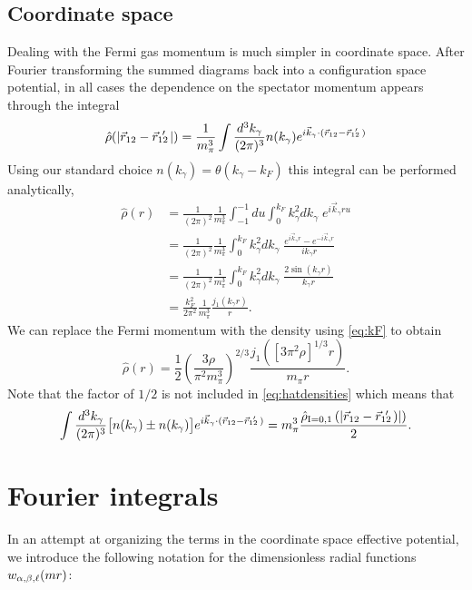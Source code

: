 \section{\label{app:rhohat}Coordinate space}

Dealing with the Fermi gas momentum is much simpler in coordinate space. After Fourier transforming the summed diagrams back into a configuration space potential, in all cases the dependence on the spectator momentum appears through the integral
\begin{equation}
\hat{\rho}(|\vec{r}_{12}-\vec{r}_{12}\!\!\!'\,\,|) = \frac{1}{m_\pi^3}\int \frac{d^3k_\gamma}{(2\pi)^3}n(k_\gamma)e^{i\vec{k}_\gamma \cdot(\vec{r}_{12}-\vec{r}_{12}\!\!\!'\,\,)}
\end{equation}
Using our standard choice $n(k_\gamma)=\theta(k_\gamma-k_F)$ this integral can be performed analytically,
\begin{equation}\begin{split}
\hat{\rho}(r) &= \frac{1}{(2\pi)^2}\frac{1}{m_\pi^3}\int_{-1}^{-1}du \int_0^{k_F} k_\gamma^2dk_\gamma \;e^{i \vec{k}_\gamma r u} \\
&= \frac{1}{(2\pi)^2}\frac{1}{m_\pi^3} \int_0^{k_F} k_\gamma^2 dk_\gamma \;\frac{e^{i\vec{k}_\gamma r}-e^{-i\vec{k}_\gamma r}}{ik_\gamma r} \\
&= \frac{1}{(2\pi)^2}\frac{1}{m_\pi^3} \int_0^{k_F} k_\gamma^2 dk_\gamma \;\frac{2 \sin(k_\gamma r)}{k_\gamma r} \\
&= \frac{k_F^2}{2\pi^2}\frac{1}{m_\pi^3} \frac{j_1(k_\gamma r)}{r}.
\end{split}
\end{equation}
We can replace the Fermi momentum with the density using \eqref{eq:kF} to obtain
\begin{equation}
\hat{\rho}(r) = \frac{1}{2}\left(\frac{3\rho}{\pi^2 m_\pi^3}\right)^{2/3} \frac{j_1( [3\pi^2\rho]^{1/3} r)}{m_\pi r}.
\end{equation}
Note that the factor of $1/2$ is not included in \eqref{eq:hatdensities} which means that
\begin{equation}
\int \frac{d^3k_\gamma}{(2\pi)^3}\big[ n(k_\gamma)\pm n(k_\gamma)\big]e^{i\vec{k}_\gamma \cdot(\vec{r}_{12}-\vec{r}_{12}\!\!\!'\,\,)} =m_\pi^3 \frac{ \hat{\rho}_{\text{I}=0,1}\left( |\vec{r}_{12}-\vec{r}_{12}\!\!\!'\,\,)| \right)}{2}.
\end{equation}

\chapter{\label{app:wNotation} Fourier integrals}

In an attempt at organizing the terms in the coordinate space effective potential, we introduce the following notation for the dimensionless radial functions $w_{\alpha,\beta,\ell}( m r )$:

